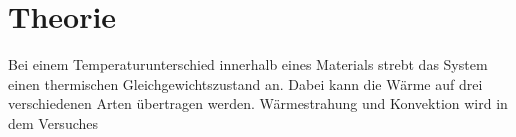 \section{Theorie}
\label{sec:Theorie}

Bei einem Temperaturunterschied innerhalb eines Materials strebt das System einen thermischen Gleichgewichtszustand an.
Dabei kann die Wärme auf drei verschiedenen Arten übertragen werden. Wärmestrahung und Konvektion wird in dem Versuches




